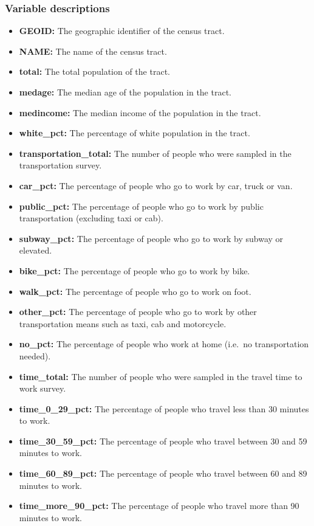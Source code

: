 \documentclass[
]{article}
\providecommand{\tightlist}{%
  \setlength{\itemsep}{0pt}\setlength{\parskip}{0pt}}
\begin{document}
\hypertarget{variable-descriptions-1}{%
\subsubsection{Variable descriptions}\label{variable-descriptions-1}}

\begin{itemize}
\tightlist
\item
  \textbf{GEOID:} The geographic identifier of the census tract.
\item
  \textbf{NAME:} The name of the census tract.
\item
  \textbf{total:} The total population of the tract.
\item
  \textbf{medage:} The median age of the population in the tract.
\item
  \textbf{medincome:} The median income of the population in the tract.
\item
  \textbf{white\_pct:} The percentage of white population in the tract.
\item
  \textbf{transportation\_total:} The number of people who were sampled
  in the transportation survey.
\item
  \textbf{car\_pct:} The percentage of people who go to work by car,
  truck or van.
\item
  \textbf{public\_pct:} The percentage of people who go to work by
  public transportation (excluding taxi or cab).
\item
  \textbf{subway\_pct:} The percentage of people who go to work by
  subway or elevated.
\item
  \textbf{bike\_pct:} The percentage of people who go to work by bike.
\item
  \textbf{walk\_pct:} The percentage of people who go to work on foot.
\item
  \textbf{other\_pct:} The percentage of people who go to work by other
  transportation means such as taxi, cab and motorcycle.
\item
  \textbf{no\_pct:} The percentage of people who work at home (i.e.~no
  transportation needed).
\item
  \textbf{time\_total:} The number of people who were sampled in the
  travel time to work survey.
\item
  \textbf{time\_0\_29\_pct:} The percentage of people who travel less
  than 30 minutes to work.
\item
  \textbf{time\_30\_59\_pct:} The percentage of people who travel
  between 30 and 59 minutes to work.
\item
  \textbf{time\_60\_89\_pct:} The percentage of people who travel
  between 60 and 89 minutes to work.
\item
  \textbf{time\_more\_90\_pct:} The percentage of people who travel more
  than 90 minutes to work.
\end{itemize}
\end{document}
